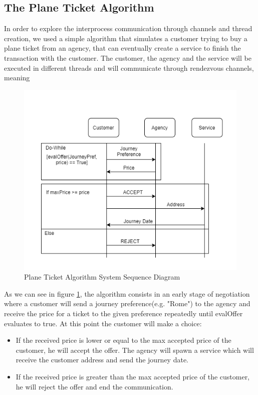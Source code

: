\documentclass[runningheads]{llncs}
\begin{document}
\subsection{The Plane Ticket Algorithm}
In order to explore the interprocess communication through channels and thread creation, we used a simple algorithm that simulates a customer trying to buy a plane ticket from an agency, that can eventually create a service to finish the transaction with the customer. The customer, the agency and the service will be executed in different threads and will communicate through rendezvous channels, meaning 
\begin{figure}[H]
\centering
\includegraphics[scale=0.4]{Algorithm.png}
\caption{Plane Ticket Algorithm System Sequence Diagram}
\label{ssd}
\end{figure}
As we can see in figure \ref{ssd}, the algorithm consists in an early stage of negotiation where a customer will send a journey preference(e.g. "Rome") to the agency and receive the price for a ticket to the given preference repeatedly until evalOffer evaluates to true.
At this point the customer will make a choice:
\begin{itemize}
\item If the received price is lower or equal to the max accepted price of the customer, he will accept the offer.
The agency will spawn a service which will receive the customer address and send the journey date.
\item If the received price is greater than the max accepted price of the customer, he will reject the offer and end the communication.
\end{itemize}
\end{document}
